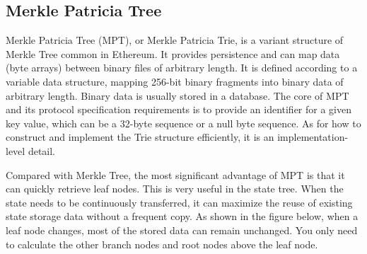 \subsection*{Merkle Patricia Tree}


Merkle Patricia Tree (MPT), or Merkle Patricia Trie, is a variant structure of Merkle Tree common in Ethereum. It provides persistence and can map data (byte arrays) between binary files of arbitrary length. It is defined according to a variable data structure, mapping 256-bit binary fragments into binary data of arbitrary length. Binary data is usually stored in a database. The core of MPT and its protocol specification requirements is to provide an identifier for a given key value, which can be a 32-byte sequence or a null byte sequence. As for how to construct and implement the Trie structure efficiently, it is an implementation-level detail.



Compared with Merkle Tree, the most significant advantage of MPT is that it can quickly retrieve leaf nodes. This is very useful in the state tree. When the state needs to be continuously transferred, it can maximize the reuse of existing state storage data without a frequent copy. As shown in the figure below, when a leaf node changes, most of the stored data can remain unchanged. You only need to calculate the other branch nodes and root nodes above the leaf node.